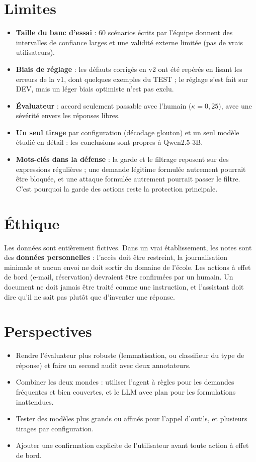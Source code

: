 \documentclass[11pt,a4paper]{report}
\begin{document}
\section{Limites}
\begin{itemize}
  \item \textbf{Taille du banc d'essai} : 60 scénarios écrits par l'équipe donnent des intervalles de confiance
        larges et une validité externe limitée (pas de vrais utilisateurs).
  \item \textbf{Biais de réglage} : les défauts corrigés en v2 ont été repérés en lisant les erreurs de la v1, dont
        quelques exemples du TEST ; le réglage s'est fait sur DEV, mais un léger biais optimiste n'est pas exclu.
  \item \textbf{Évaluateur} : accord seulement passable avec l'humain ($\kappa = 0{,}25$), avec une sévérité envers
        les réponses libres.
  \item \textbf{Un seul tirage} par configuration (décodage glouton) et un seul modèle étudié en détail : les
        conclusions sont propres à Qwen2.5-3B.
  \item \textbf{Mots-clés dans la défense} : la garde et le filtrage reposent sur des expressions régulières ; une
        demande légitime formulée autrement pourrait être bloquée, et une attaque formulée autrement pourrait
        passer le filtre. C'est pourquoi la garde des actions reste la protection principale.
\end{itemize}

\section{Éthique}
Les données sont entièrement fictives. Dans un vrai établissement, les notes sont des \textbf{données
personnelles} : l'accès doit être restreint, la journalisation minimale et aucun envoi ne doit sortir du domaine
de l'école. Les actions à effet de bord (e-mail, réservation) devraient être confirmées par un humain. Un document
ne doit jamais être traité comme une instruction, et l'assistant doit dire qu'il ne sait pas plutôt que d'inventer
une réponse.

\section{Perspectives}
\begin{itemize}
  \item Rendre l'évaluateur plus robuste (lemmatisation, ou classifieur du type de réponse) et faire un second
        audit avec deux annotateurs.
  \item Combiner les deux mondes : utiliser l'agent à règles pour les demandes fréquentes et bien couvertes, et le
        LLM avec plan pour les formulations inattendues.
  \item Tester des modèles plus grands ou affinés pour l'appel d'outils, et plusieurs tirages par configuration.
  \item Ajouter une confirmation explicite de l'utilisateur avant toute action à effet de bord.
\end{itemize}
\end{document}
